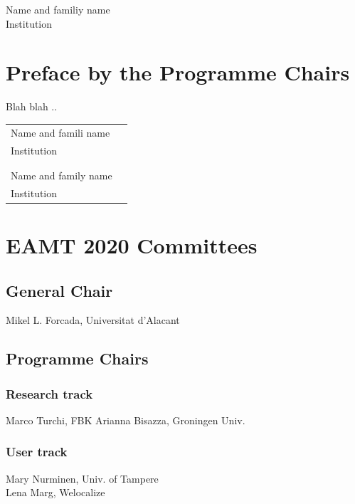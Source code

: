 \documentclass[a4paper,11pt,twoside]{book}
\begin{document}
\begin{center}
Name and familiy name\\
\noindent Institution
\end{center}


\chapter*{Preface by the Programme Chairs}

Blah blah ..

\vspace{1cm}
\begin{center}
\begin{tabular}{ll}
Name and famili name\\
Institution\\
\\
\\
Name and family name\\
Institution\\
\end{tabular}

\end{center}

\chapter*{EAMT 2020 Committees}

\section*{General Chair}
\noindent Mikel L. Forcada, Universitat d’Alacant


\section*{Programme Chairs}
\subsection*{Research track}
\noindent Marco Turchi, FBK
\noindent Arianna Bisazza, Groningen Univ.

\subsection*{User track}
\noindent Mary Nurminen, Univ. of Tampere\\
\noindent Lena Marg, Welocalize
\end{document}
